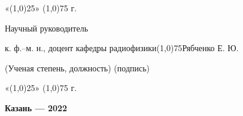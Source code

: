 \documentclass[a4paper]{article}
\begin{document}
\begin{titlepage}
	\large«\line(1,0){25}» \line(1,0){75} г.
	
	\vspace{30pt}
	
	Научный руководитель
	
	\vspace{6pt}

	к. ф.–м. н., доцент кафедры радиофизики\quad\line(1,0){75}\quad Рябченко Е. Ю.

	\tiny{\qquad\qquad (Ученая степень, должность)    \qquad\qquad\!\;\;\qquad\qquad\qquad\quad\quad\!\quad\qquad\qquad\!\qquad\quad\quad\qquad(подпись)}
	
	\vspace{1pt}
	
	\large«\line(1,0){25}» \line(1,0){75} г.
	
	\vspace{\fill}
	
	\begin{center}
		\textbf{Казань --- 2022}
	\end{center}
	
\end{titlepage}
\end{document}
